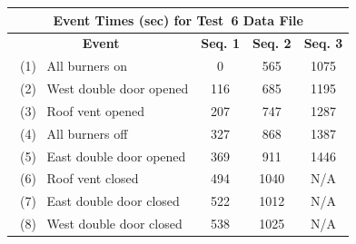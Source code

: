\begin{figure}[!ht]
\renewcommand{\baselinestretch}{1}
\begin{minipage}[b]{0.98\columnwidth}
\begin{center}
	\begin{tabular}{lccc}
	\multicolumn{4}{c}{\normalsize Event Times (sec) for Test~6 Data File} \\
	\toprule
	\multicolumn{1}{c}{\textbf{Event}} 	& \textbf{Seq. 1}	& \textbf{Seq. 2} 	& \textbf{Seq. 3} 	\\
	\midrule
	~(1)~ All burners on 				&	0				&	565				&	1075			\\
	~(2)~ West double door opened 		&	116				&   685				&	1195			\\
	~(3)~ Roof vent opened 		    	&	207				&	747 			& 	1287 			\\
	~(4)~ All burners off 				&	327				&   868				&	1387			\\
	~(5)~ East double door opened		&	369				&   911				&	1446			\\
	~(6)~ Roof vent closed 				&	494				&   1040			&	N/A				\\
	~(7)~ East double door closed		&	522 			&	1012			&	N/A 			\\
	~(8)~ West double door closed		&	538 			&	1025			&	N/A				\\
	\bottomrule
	\end{tabular}

\end{center}
\end{minipage}
\end{figure}
